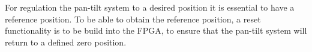 \documentclass[../../main.tex]{subfiles}
\begin{document}


For regulation the pan-tilt system to a desired position it is essential to have a reference position. To be able to obtain the reference position, a reset functionality is to be build into the FPGA, to ensure that the pan-tilt system will return to a defined zero position. 

\end{document}
